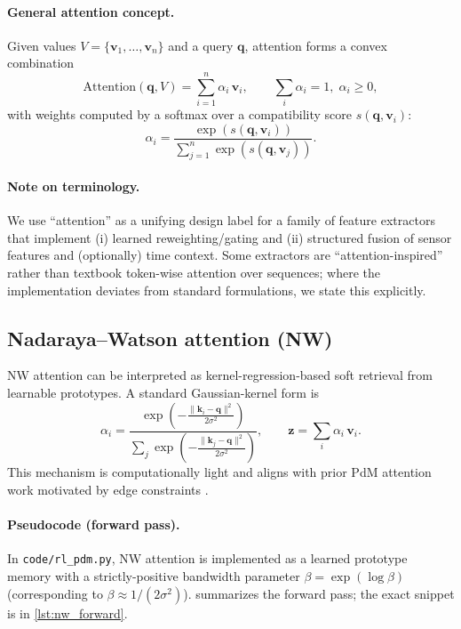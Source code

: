 \documentclass[11pt]{article}
\begin{document}
\paragraph{General attention concept.}
Given values $V=\{\mathbf{v}_1,\ldots,\mathbf{v}_n\}$ and a query $\mathbf{q}$, attention forms a convex combination
\begin{equation}
\mathrm{Attention}(\mathbf{q},V)=\sum_{i=1}^{n}\alpha_i\,\mathbf{v}_i,\qquad \sum_i\alpha_i=1,\;\alpha_i\ge 0,
\end{equation}
with weights computed by a softmax over a compatibility score $s(\mathbf{q},\mathbf{v}_i)$:
\begin{equation}
\alpha_i = \frac{\exp(s(\mathbf{q},\mathbf{v}_i))}{\sum_{j=1}^n\exp(s(\mathbf{q},\mathbf{v}_j))}.
\end{equation}

\paragraph{Note on terminology.}
We use ``attention'' as a unifying design label for a family of feature extractors that implement (i) learned reweighting/gating and (ii) structured fusion of sensor features and (optionally) time context. Some extractors are ``attention-inspired'' rather than textbook token-wise attention over sequences; where the implementation deviates from standard formulations, we state this explicitly.

\subsection{Nadaraya--Watson attention (NW)}
NW attention can be interpreted as kernel-regression-based soft retrieval from learnable prototypes. A standard Gaussian-kernel form is
\begin{equation}
\alpha_i = \frac{\exp\left(-\tfrac{\lVert \mathbf{k}_i-\mathbf{q}\rVert^2}{2\sigma^2}\right)}{\sum_j \exp\left(-\tfrac{\lVert \mathbf{k}_j-\mathbf{q}\rVert^2}{2\sigma^2}\right)},
\qquad \mathbf{z}=\sum_i\alpha_i\,\mathbf{v}_i.
\end{equation}
This mechanism is computationally light and aligns with prior PdM attention work motivated by edge constraints \parencite{Siraskar2024NWAttention}.

\paragraph{Pseudocode (forward pass).}
In \texttt{code/rl\_pdm.py}, NW attention is implemented as a learned prototype memory with a strictly-positive bandwidth parameter $\beta=\exp(\log\beta)$ (corresponding to $\beta\approx 1/(2\sigma^2)$).  summarizes the forward pass; the exact snippet is in \cref{lst:nw_forward}.
\end{document}
